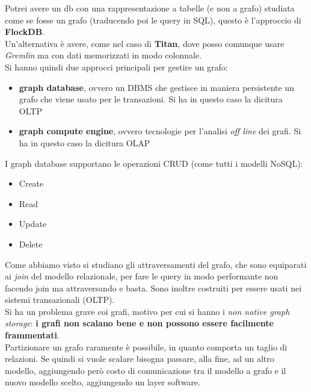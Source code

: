 \documentclass[a4paper,12pt, oneside]{book}
\begin{document}
Potrei avere un db con una rappresentazione a tabelle (e non a grafo) studiata
come se fosse un grafo (traducendo poi le query in SQL), questo è l'approccio di
\textbf{FlockDB}.\\
Un'alternativa è avere, come nel caso di \textbf{Titan}, dove posso comunque
usare \textit{Gremlin} ma con dati memorizzati in modo colonnale.\\
Si hanno quindi due approcci principali per gestire un grafo:
\begin{itemize}
  \item \textbf{graph database}, ovvero un DBMS che gestisce in maniera
  persistente un grafo che viene usato per le transazioni. Si ha in questo caso
  la dicitura OLTP
  \item \textbf{graph compute engine}, ovvero tecnologie per l'analisi
  \textit{off line} dei grafi. Si ha in questo caso la dicitura OLAP
\end{itemize}
I graph database supportano le operazioni CRUD (come tutti i modelli NoSQL):
\begin{itemize}
  \item Create
  \item Read
  \item Update
  \item Delete
\end{itemize}
Come abbiamo visto si studiano gli attraversamenti del grafo, che sono
equiparati ai \textit{join} del modello relazionale, per fare le query in modo
performante non facendo join ma attraversando e basta. Sono inoltre costruiti
per essere usati nei sistemi transazionali (OLTP). \\
Si ha un problema grave coi grafi, motivo per cui si hanno i \textit{non native
  graph storage}: \textbf{i grafi non scalano bene e non possono essere
  facilmente frammentati}.\\
Partizionare un grafo raramente è possibile, in quanto comporta un taglio di
relazioni. Se quindi si vuole scalare bisogna passare, alla fine, ad un altro
modello, aggiungendo però costo di comunicazione tra il modello a grafo e il
nuovo modello scelto, aggiungendo un layer software.\\
\end{document}
